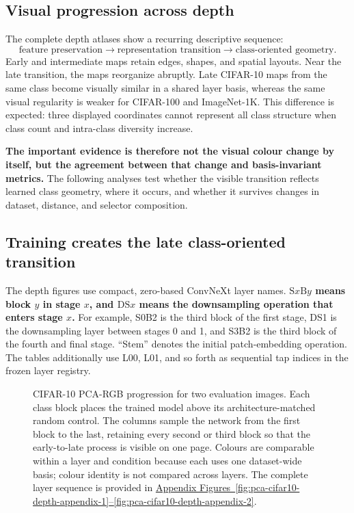 \subsection{Visual progression across depth}

The complete depth atlases show a recurring descriptive sequence:
\begin{equation}
    \text{feature preservation}
    \longrightarrow
    \text{representation transition}
    \longrightarrow
    \text{class-oriented geometry}.
    \label{eq:pca-progression}
\end{equation}
Early and intermediate maps retain edges, shapes, and spatial layouts. Near the
late transition, the maps reorganize abruptly. Late CIFAR-10 maps from the same
class become visually similar in a shared layer basis, whereas the same visual
regularity is weaker for CIFAR-100 and ImageNet-1K. This difference is expected:
three displayed coordinates cannot represent all class structure when class
count and intra-class diversity increase.

\textbf{The important evidence is therefore not the visual colour change by
itself, but the agreement between that change and basis-invariant metrics.}
The following analyses test whether the visible transition reflects learned
class geometry, where it occurs, and whether it survives changes in dataset,
distance, and selector composition.

\subsection{Training creates the late class-oriented transition}

The depth figures use compact, zero-based ConvNeXt layer names.
\textbf{$\mathrm{S}x\mathrm{B}y$ means block $y$ in stage $x$, and
$\mathrm{DS}x$ means the downsampling operation that enters stage $x$.}
For example, S0B2 is the third block of the first stage, DS1 is the
downsampling layer between stages 0 and 1, and S3B2 is the third block of the
fourth and final stage. ``Stem'' denotes the initial patch-embedding operation.
The tables additionally use L00, L01, and so forth as sequential tap indices
in the frozen layer registry.

\begin{figure}[!htbp]
    \centering
    \caption{CIFAR-10 PCA-RGB progression for two evaluation images. Each
    class block places the trained model above its architecture-matched random
    control. The columns sample the network from the first block to the last,
    retaining every second or third block so that the early-to-late process is
    visible on one page. Colours are comparable within a layer and condition
    because each uses one dataset-wide basis; colour identity is not compared
    across layers. The complete layer sequence is provided in
    \hyperref[fig:pca-cifar10-depth-appendix-1]{Appendix Figures~\ref*{fig:pca-cifar10-depth-appendix-1}--\ref*{fig:pca-cifar10-depth-appendix-2}}.}
    \label{fig:pca-cifar10-random-control}
\end{figure}

